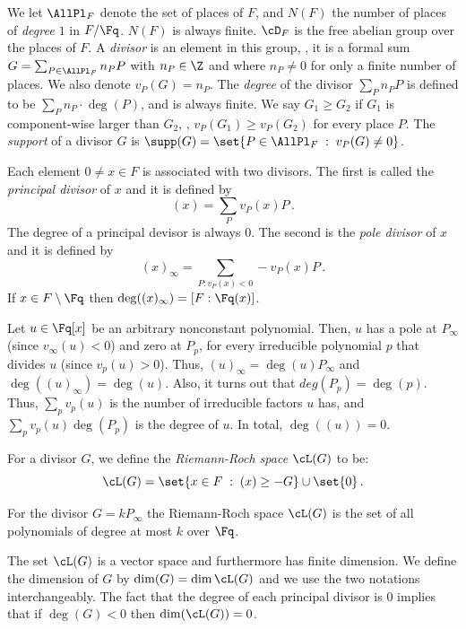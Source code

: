We let $\AllPl_F$ denote the set of places of $F$, and $N(F)$ the
number of places of \emph{degree $1$} in $F/\Fq $. $N(F)$ is always
finite. $\cD_F$ is the free abelian group over the places of $F$. A
\emph{divisor} is an element in this group, \ie, it is a formal sum
$G=\sum_{P \in \AllPl_F} n_P P$ with $n_P \in \Z$ and where $n_P
\neq 0$ for only a finite number of places. We also denote
$v_P(G)=n_P$. The \emph{degree} of the divisor $\sum_P n_P P$ is
defined to be $\sum_P n_P \cdot \deg(P)$, and is always finite.
We say $G_1 \ge G_2$ if $G_1$ is component-wise larger than $G_2$,
\ie, $v_P(G_1) \ge v_P(G_2)$ for every place $P$. The \emph{support}
of a divisor $G$ is $\supp(G) = \set{ P \in \AllPl_F \;:\; v_P(G)\neq
0}$.

Each element $0 \neq x \in F$ is associated with two divisors. The
first is called the \emph{principal divisor} of $x$ and it is defined
by
$$(x) = \sum_{P} v_P(x) P\,.$$
The degree of a principal devisor is always $0$. The second is the
\emph{pole divisor} of $x$ and it is defined by
$$(x)_\infty = \sum_{P: v_P(x) < 0} -v_P(x) P\,.$$ If $x\in F \setminus \Fq$ then $\deg((x)_\infty)=[F:\Fq (x)]$.

\begin{example}
\label{exa:rational:2} Let $u \in \Fq[x]$ be an arbitrary nonconstant polynomial.
Then, $u$ has a pole at $P_\infty$ (since
$v_\infty(u) < 0$) and zero at $P_p$, for every irreducible
polynomial $p$ that divides $u$ (since $v_p(u) > 0$). Thus,
$(u)_\infty = \deg(u) P_\infty$ and $\deg((u)_\infty)=\deg(u)$.
Also, it turns out that $deg(P_p)=\deg(p)$. Thus, $\sum_p v_p(u)$ is the
number of irreducible factors $u$ has, and $\sum_p v_p(u) \deg(P_p)$
is the degree of $u$. In total, $\deg((u))=0$.
\end{example}

For a divisor $G$, we define the \emph{Riemann-Roch space} $\cL(G)$
to be:
$$\cL(G) = \set{ x\in F \;:\; (x) \ge -G} \cup \set{0}\,.$$


\begin{example}
%
%
%
For the divisor $G=kP_\infty$ the Riemann-Roch space $\cL(G)$ is the set of all polynomials of
degree at most $k$ over $\Fq$.
\end{example}

The set $\cL(G)$ is a vector space and furthermore has finite
dimension. We define the dimension of $G$ by $\dim (G) = \dim
\cL(G)$ and we use the two notations interchangeably. The fact that
the degree of each principal divisor is $0$ implies that if $\deg(G)
< 0$ then $\dim(\cL(G)) = 0$.

